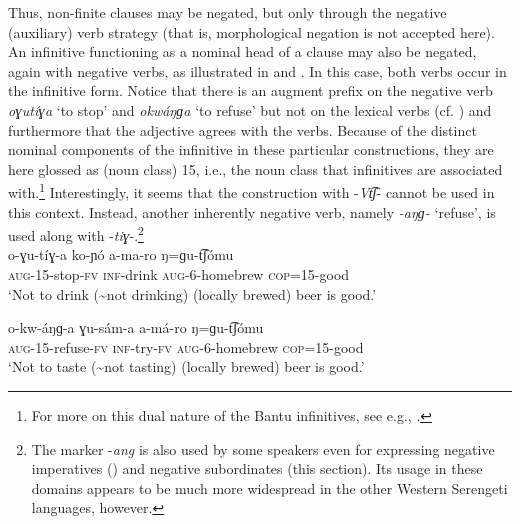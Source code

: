 \documentclass[output=paper,colorlinks,citecolor=brown,draftmode]{langscibook}
\begin{document}
Thus, non-finite clauses may be negated, but only through the negative (auxiliary) verb strategy (that is, morphological negation is not accepted here). An infinitive functioning as a nominal head of a clause may also be negated, again with negative verbs, as illustrated in  and . In this case, both verbs occur in the infinitive form. Notice that there is an augment prefix on the negative verb \textit{oɣutíɣa} ‘to stop’ and \textit{okwáŋɡa} ‘to refuse’ but not on the lexical verbs (cf. ) and furthermore that the adjective agrees with the verbs. Because of the distinct nominal components of the infinitive in these particular constructions, they are here glossed as (noun class) 15, i.e., the noun class that infinitives are associated with.\footnote{For more on this dual nature of the Bantu infinitives, see e.g., \citet{Schadeberg2003}.} Interestingly, it seems that the construction with \nobreakdash-\textit{Vt͡ʃ}\nobreakdash- cannot be used in this context. Instead, another inherently negative verb, namely \textit{\nobreakdash-aŋɡ\nobreakdash-} ‘refuse’, is used along with \nobreakdash-\textit{tiɣ}\nobreakdash-.\footnote{The marker -\textit{ang} is also used by some speakers even for expressing negative imperatives () and negative subordinates (this section). Its usage in these domains appears to be much more widespread in the other Western Serengeti languages, however.} \\

\ea\label{ex:ngo:58} 
    \gll o{}-ɣu-tíɣ{}-a ko-ɲó a{}-ma-ro ŋ=ɡu-t͡ʃómu \\ 
        \textsc{aug}{}-15{}-stop-\textsc{fv} \textsc{inf}{}-drink \textsc{aug-}6-homebrew \textsc{cop}=15-good\\
    \glt ‘Not to drink ({\textasciitilde}not drinking) (locally brewed) beer is good.’
\z 

\ea\label{ex:ngo:59} 
    \gll  o{}-kw-áŋɡ-a ɣu-sám-a a{}-má{}-ro ŋ=ɡu-t͡ʃómu\\ 
          \textsc{aug-15}{}-refuse-\textsc{fv} \textsc{inf}{}-try{}-\textsc{fv} \textsc{aug-}6-homebrew \textsc{cop}=15-good\\
    \glt ‘Not to taste ({\textasciitilde}not tasting) (locally brewed) beer is good.’
\z 
\end{document}
